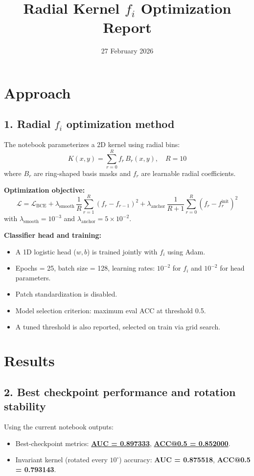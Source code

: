 \documentclass{article}
\begin{document}
\title{Radial Kernel \texorpdfstring{$f_i$}{fi} Optimization Report}
\author{}
\date{27 February 2026}
\maketitle

\section*{Approach}
\subsection*{\hypertarget{ans1}{1. Radial \texorpdfstring{$f_i$}{fi} optimization method}}
The notebook parameterizes a 2D kernel using radial bins:
\[
K(x,y)=\sum_{r=0}^{R} f_r\,B_r(x,y),\quad R=10
\]
where $B_r$ are ring-shaped basis masks and $f_r$ are learnable radial coefficients.

\vspace{0.5em}
\textbf{Optimization objective:}
\[
\mathcal{L}=\mathcal{L}_{\text{BCE}}+\lambda_{\text{smooth}}\,\frac{1}{R}\sum_{r=1}^{R}(f_r-f_{r-1})^2+\lambda_{\text{anchor}}\,\frac{1}{R+1}\sum_{r=0}^{R}(f_r-f_r^{\text{init}})^2
\]
with \(\lambda_{\text{smooth}}=10^{-3}\) and \(\lambda_{\text{anchor}}=5\times10^{-2}\).

\vspace{0.5em}
\textbf{Classifier head and training:}
\begin{itemize}
    \item A 1D logistic head ($w,b$) is trained jointly with $f_i$ using Adam.
    \item Epochs = 25, batch size = 128, learning rates: $10^{-2}$ for $f_i$ and $10^{-2}$ for head parameters.
    \item Patch standardization is disabled.
    \item Model selection criterion: maximum eval ACC at threshold 0.5.
    \item A tuned threshold is also reported, selected on train via grid search.
\end{itemize}

\section*{Results}
\subsection*{\hypertarget{ans2}{2. Best checkpoint performance and rotation stability}}
Using the current notebook outputs:
\begin{itemize}
    \item Best-checkpoint metrics: \underline{\textbf{AUC = 0.897333}}, \underline{\textbf{ACC@0.5 = 0.852000}}.
    \item Invariant kernel (rotated every $10^\circ$) accuracy: \textbf{AUC = 0.875518}, \textbf{ACC@0.5 = 0.793143}.
\end{itemize}
\end{document}
